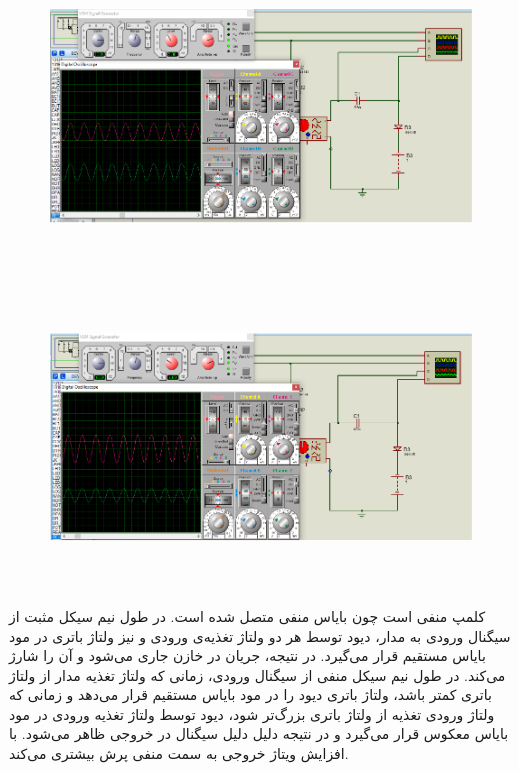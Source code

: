 \documentclass[12pt]{article}
\begin{document}
\begin{figure}[H]
	\begin{center}
		\includegraphics[width=\textwidth, height=8cm]{./images/8.5}
	\end{center}
\end{figure}
\begin{figure}[H]
	\begin{center}
		\includegraphics[width=\textwidth, height=8cm]{./images/8.6}
	\end{center}
\end{figure}

کلمپ منفی است چون بایاس منفی متصل شده است. در طول نیم سیکل مثبت از سیگنال ورودی به مدار، دیود توسط هر دو ولتاژ تغذیه‌ی ورودی و نیز ولتاژ باتری در مود بایاس مستقیم قرار می‌گیرد. در نتیجه، جریان در خازن جاری می‌شود و آن را شارژ می‌کند. در طول نیم سیکل منفی از سیگنال ورودی، زمانی که ولتاژ تغذیه مدار از ولتاژ باتری کمتر باشد، ولتاژ باتری دیود را در مود بایاس مستقیم قرار می‌دهد و زمانی که ولتاژ ورودی تغذیه از ولتاژ باتری بزرگ‌تر شود، دیود توسط ولتاژ تغذیه‌ ورودی در مود بایاس معکوس قرار می‌گیرد و در نتیجه دلیل دلیل سیگنال در خروجی ظاهر می‌شود. با افزایش ویتاژ‌  خروجی به سمت منفی پرش بیشتری می‌کند.
\end{document}
